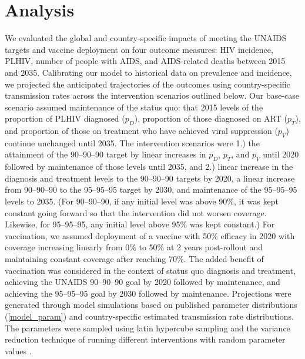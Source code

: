 \documentclass{article}
\begin{document}
\section{Analysis}

We evaluated the global and country-specific impacts of meeting the
UNAIDS targets and vaccine deployment on four outcome measures: HIV
incidence, PLHIV, number of people with AIDS, and AIDS-related deaths
between 2015 and 2035. Calibrating our model to historical data on
prevalence and incidence, we projected the anticipated trajectories of
the outcomes using country-specific transmission rates across the
intervention scenarios outlined below.  Our base-case scenario assumed
maintenance of the status quo: that 2015 levels of the proportion of
PLHIV diagnosed ($p_{D}$), proportion of those diagnosed on ART
($p_{T}$), and proportion of those on treatment who have achieved
viral suppression ($p_{V}$) continue unchanged until 2035.  The
intervention scenarios were 1.) the attainment of the 90--90--90
target by linear increases in $p_{D}$, $p_{T}$, and $p_{V}$ until 2020
followed by maintenance of those levels until 2035, and 2.) linear
increase in the diagnosis and treatment levels to the 90--90--90
targets by 2020, a linear increase from 90--90--90 to the 95--95--95
target by 2030, and maintenance of the 95--95--95 levels to 2035. (For
90--90--90, if any initial level was above 90\%, it was kept constant
going forward so that the intervention did not worsen coverage.
Likewise, for 95--95--95, any initial level above 95\% was kept
constant.)  For vaccination, we assumed deployment of a vaccine with
50\% efficacy in 2020 with coverage increasing linearly from 0\% to
50\% at 2 years post-rollout and maintaining constant coverage after
reaching 70\%. The added benefit of vaccination was considered in the
context of status quo diagnosis and treatment, achieving the UNAIDS
90–90–90 goal by 2020 followed by maintenance, and achieving the
95–95–95 goal by 2030 followed by maintenance.  Projections were
generated through model simulations based on published parameter
distributions (\autoref{model_param}) and country-specific estimated
transmission rate distributions. The parameters were sampled using
latin hypercube sampling \cite{blower1994} and the variance reduction
technique of running different interventions with random parameter
values \cite{shechter2006}.
\end{document}
